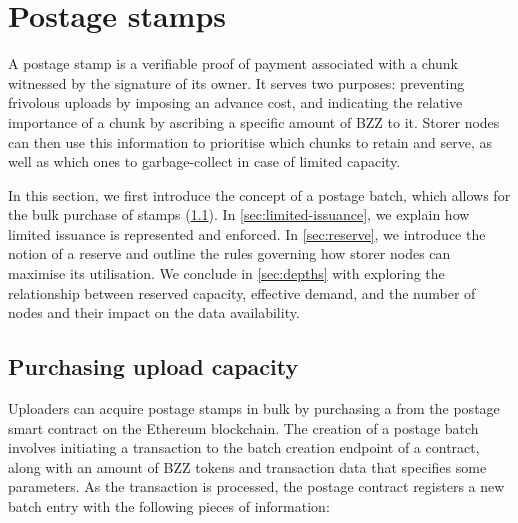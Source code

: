 \section{Postage stamps}\label{sec:postage-stamps}

A postage stamp is a verifiable proof of payment associated with a chunk witnessed by the signature of its owner. It serves two purposes: preventing frivolous uploads by imposing an advance cost, and indicating the relative importance of a chunk by ascribing a specific amount of BZZ to it. Storer nodes can then use this information to prioritise which chunks to retain and serve, as well as which ones to garbage-collect in case of limited capacity.

In this section, we first introduce the concept of a postage batch, which allows for the bulk purchase of stamps (\ref{sec:purchasing-upload}). In \ref{sec:limited-issuance}, we explain how limited issuance is represented and enforced. In \ref{sec:reserve}, we introduce the notion of a reserve and outline the rules governing how storer nodes can maximise its utilisation. We conclude in \ref{sec:depths} with exploring the relationship between reserved capacity, effective demand, and the number of nodes and their impact on the data availability.

\subsection{Purchasing upload capacity}\label{sec:purchasing-upload}


Uploaders can acquire postage stamps in bulk by purchasing a  from the postage smart contract on the Ethereum blockchain. The creation of a postage batch involves initiating a transaction to the batch creation endpoint of a contract, along with an amount of BZZ tokens and transaction data that specifies some parameters. As the transaction is processed, the postage contract registers a new batch entry with the following pieces of information:

